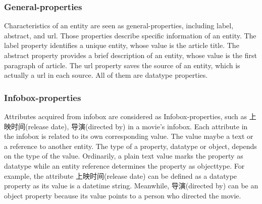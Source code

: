 \documentclass[runningheads,a4paper]{llncs}
\begin{document}
\subsubsection{General-properties}
Characteristics of an entity are seen as general-properties, including label, abstract, and url. Those properties describe specific information of an entity. The label property identifies a unique entity, whose value is the article title. The abstract property provides a brief description of an entity, whose value is the first paragraph of article. The url property saves the source of an entity, which is actually a url in each source. All of them are datatype properties.

\subsubsection{Infobox-properties}
Attributes acquired from infobox are considered as Infobox-properties, such as 上映时间(release date), 导演(directed by) in a movie's infobox. Each attribute in the infobox is related to its own corresponding value. The value maybe a text or a reference to another entity. The type of a property, datatype or object, depends on the type of the value. Ordinarily, a plain text value marks the property as datatype while an entity reference determines the property as objecttype. For example, the attribute 上映时间(release date) can be defined as a datatype property as its value is a datetime string. Meanwhile, 导演(directed by) can be an object property because its value points to a person who directed the movie.
\end{document}
